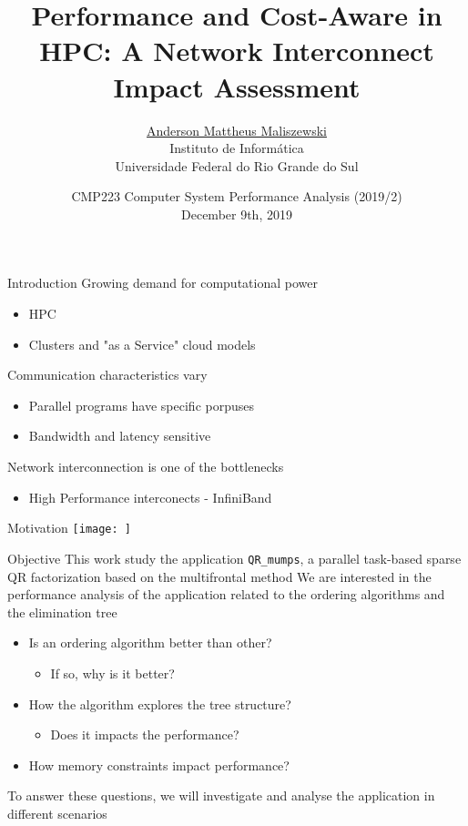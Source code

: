 \documentclass[presentation]{beamer}
\title{Performance and Cost-Aware in HPC: A Network Interconnect Impact Assessment}
\author{
\large
\underline{Anderson Mattheus Maliszewski} \\
\small
Instituto de Informática\\
Universidade Federal do Rio Grande do Sul\\
}
\date{CMP223 Computer System Performance Analysis (2019/2) \\ December 9th, 2019}
\begin{document}
\maketitle

\begin{frame}{Introduction}
\vfill
Growing demand for computational power
\begin{itemize}
\item HPC
\item Clusters and "as a Service" cloud models
\end{itemize}
\pause \vfill
Communication characteristics vary
\begin{itemize}
\item Parallel programs have specific porpuses
\item Bandwidth and latency sensitive
\end{itemize}
\pause \vfill
Network interconnection is one of the \alert{bottlenecks}
\begin{itemize}
\item High Performance interconects - InfiniBand
\end{itemize}
\end{frame}

\begin{frame}{Motivation}
    \texttt{[image: ]}
\end{frame}


\begin{frame}[fragile,label={sec:org2ddf64a}]{Objective}
 \vfill
This work study the application \alert{\texttt{QR\_mumps}}, a parallel task-based
sparse QR factorization based on the \alert{multifrontal method}
\pause \vfill
We are interested in the performance analysis of the application
related to the \alert{ordering algorithms} and the \alert{elimination tree}
\pause \vfill
\begin{itemize}
\item Is an \alert{ordering} algorithm \alert{better than other}? 
\begin{itemize}
\item If so, why is it better?
\end{itemize}
\end{itemize}
\pause \vfill
\begin{itemize}
\item How the algorithm \alert{explores} the tree structure? 
\begin{itemize}
\item Does it impacts the performance?
\end{itemize}
\end{itemize}
\pause \vfill
\begin{itemize}
\item How \alert{memory constraints} impact performance?
\end{itemize}
\pause \vfill
To answer these questions, we will investigate and analyse the
application in different scenarios
\vfill
\end{frame}
\end{document}
